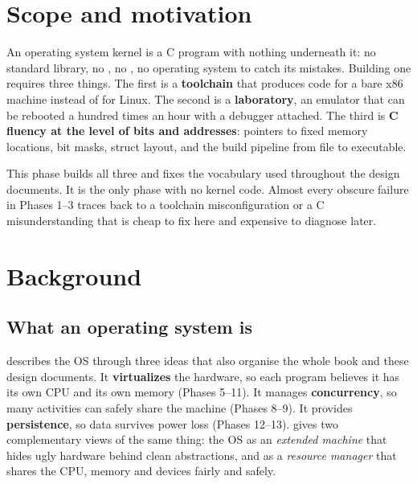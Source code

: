 \documentclass[11pt,a4paper]{article}
\begin{document}


\section{Scope and motivation}

An operating system kernel is a C program with nothing underneath it: no standard library, no , no
, no operating system to catch its mistakes. Building one requires three things. The first
is a \textbf{toolchain} that produces code for a bare x86 machine instead of for Linux. The second is a
\textbf{laboratory}, an emulator that can be rebooted a hundred times an hour with a debugger attached. The third is
\textbf{C fluency at the level of bits and addresses}: pointers to fixed memory locations, bit masks, struct layout,
and the build pipeline from  file to executable.

This phase builds all three and fixes the vocabulary used throughout the design documents. It is the only phase with
no kernel code. Almost every obscure failure in Phases 1--3 traces back to a toolchain misconfiguration or a C
misunderstanding that is cheap to fix here and expensive to diagnose later.

\section{Background}

\subsection{What an operating system is}

\OSTEP describes the OS through three ideas that also organise the whole book and these design documents. It
\textbf{virtualizes} the hardware, so each program believes it has its own CPU and its own memory (Phases 5--11). It
manages \textbf{concurrency}, so many activities can safely share the machine (Phases 8--9). It provides
\textbf{persistence}, so data survives power loss (Phases 12--13). \MOS gives two complementary views of the same
thing: the OS as an \emph{extended machine} that hides ugly hardware behind clean abstractions, and as a
\emph{resource manager} that shares the CPU, memory and devices fairly and safely.
\end{document}
